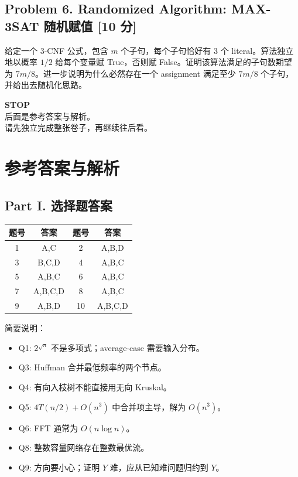\documentclass[UTF8,a4paper,11pt]{ctexart}
\newcommand{\points}[1]{\hfill{\small\textbf{[#1 分]}}}
\begin{document}
\subsection*{Problem 6. Randomized Algorithm: MAX-3SAT 随机赋值 \points{10}}

给定一个 3-CNF 公式，包含 $m$ 个子句，每个子句恰好有 3 个 literal。算法独立地以概率 $1/2$ 给每个变量赋 True，否则赋 False。证明该算法满足的子句数期望为 $7m/8$。进一步说明为什么必然存在一个 assignment 满足至少 $7m/8$ 个子句，并给出去随机化思路。

\newpage
\thispagestyle{empty}
\begin{center}
{\Huge \textbf{STOP}}\\[2em]
{\Large 后面是参考答案与解析。}\\[1em]
{\Large 请先独立完成整张卷子，再继续往后看。}
\end{center}

\newpage
\section*{参考答案与解析}

\subsection*{Part I. 选择题答案}

\begin{center}
\begin{tabular}{c|c@{\qquad}c|c}
\toprule
题号 & 答案 & 题号 & 答案\\
\midrule
1 & A,C & 2 & A,B,D\\
3 & B,C,D & 4 & A,B,C\\
5 & A,B,C & 6 & A,B,C\\
7 & A,B,C,D & 8 & A,B,C\\
9 & A,B,D & 10 & A,B,C,D\\
\bottomrule
\end{tabular}
\end{center}

简要说明：
\begin{itemize}
  \item Q1: $2^{\sqrt n}$ 不是多项式；average-case 需要输入分布。
  \item Q3: Huffman 合并最低频率的两个节点。
  \item Q4: 有向入枝树不能直接用无向 Kruskal。
  \item Q5: $4T(n/2)+O(n^3)$ 中合并项主导，解为 $O(n^3)$。
  \item Q6: FFT 通常为 $O(n\log n)$。
  \item Q8: 整数容量网络存在整数最优流。
  \item Q9: 方向要小心；证明 $Y$ 难，应从已知难问题归约到 $Y$。
\end{itemize}
\end{document}
